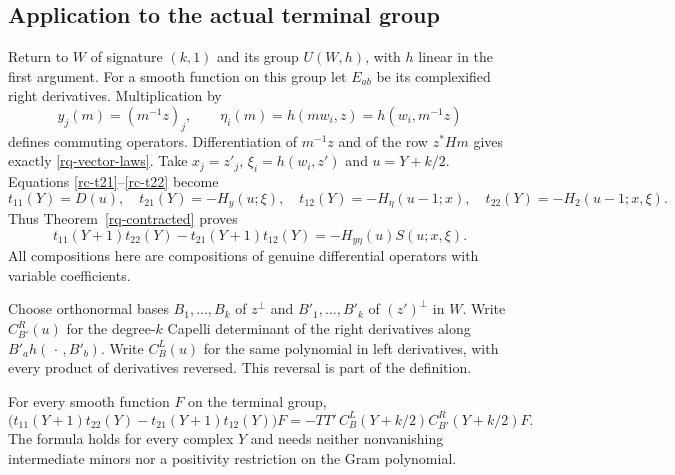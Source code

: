 \subsection{Application to the actual terminal group}

Return to $W$ of signature $(k,1)$ and its group
$U(W,h)$, with $h$ linear in the first argument.
For a smooth function on this group let $E_{ab}$
be its complexified right derivatives.
Multiplication by
\[
 y_j(m)=(m^{-1}z)_j,\qquad
       \eta_i(m)=h(mw_i,z)=h(w_i,m^{-1}z)
\]
defines commuting operators.
Differentiation of $m^{-1}z$ and of the row
$z^*Hm$ gives exactly
\eqref{rq-vector-laws}.
Take $x_j=z'_j$, $\xi_i=h(w_i,z')$ and
$u=Y+k/2$.  Equations
\eqref{rc-t21}--\eqref{rc-t22} become
\[
 t_{11}(Y)=D(u),\quad
 t_{21}(Y)=-H_y(u;\xi),\quad
 t_{12}(Y)=-H_\eta(u-1;x),\quad
 t_{22}(Y)=-H_2(u-1;x,\xi).
\]
Thus Theorem~\ref{rq-contracted} proves
\begin{equation}\label{rq-terminal-factorization}
 t_{11}(Y+1)t_{22}(Y)-t_{21}(Y+1)t_{12}(Y)
                         =-H_{y\eta}(u)S(u;x,\xi).
\end{equation}
All compositions here are compositions of genuine
differential operators with variable coefficients.

Choose orthonormal bases $B_1,\ldots,B_k$ of $z^\perp$
and $B'_1,\ldots,B'_k$ of $(z')^\perp$ in $W$.
Write $C^R_{B'}(u)$ for the degree-$k$ Capelli
determinant of the right derivatives along
$B'_a h(\,\cdot\,,B'_b)$.
Write $C^L_B(u)$ for the same polynomial in left
derivatives, with every product of derivatives reversed.
This reversal is part of the definition.

\begin{theorem}\label{rq-terminal-determinant}
For every smooth function $F$ on the terminal group,
\begin{equation}\label{rq-exact-terminal}
 \bigl(t_{11}(Y+1)t_{22}(Y)-t_{21}(Y+1)t_{12}(Y)\bigr)F
          =-TT'\,C^L_B(Y+k/2)C^R_{B'}(Y+k/2)F.
\end{equation}
The formula holds for every complex $Y$ and needs
neither nonvanishing intermediate minors nor a
positivity restriction on the Gram polynomial.
\end{theorem}

